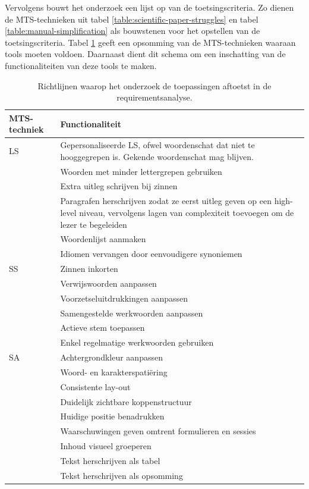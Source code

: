 Vervolgens bouwt het onderzoek een lijst op van de toetsingscriteria. Zo dienen de MTS-technieken uit tabel \ref{table:scientific-paper-struggles} en tabel \ref{table:manual-simplification} als bouwstenen voor het opstellen van de toetsingscriteria. Tabel \ref{table:criteria-requirementsanalysis} geeft een opsomming van de MTS-technieken waaraan tools moeten voldoen. Daarnaast dient dit schema om een inschatting van de functionaliteiten van deze tools te maken.

\begin{center}
	\begin{table}[H]
		\begin{tabular}{ | m{4cm} | m{11cm} | } 
			\hline
			\textbf{MTS-techniek} & \textbf{Functionaliteit} \\
			\hline
			LS & Gepersonaliseerde LS, ofwel woordenschat dat niet te hooggegrepen is. Gekende woordenschat mag blijven. \\
			& Woorden met minder lettergrepen gebruiken \\
			& Extra uitleg schrijven bij zinnen \\
			& Paragrafen herschrijven zodat ze eerst uitleg geven op een high-level niveau, vervolgens lagen van complexiteit toevoegen om de lezer te begeleiden \\
			& Woordenlijst aanmaken \\
			& Idiomen vervangen door eenvoudigere synoniemen \\
			\hline
			SS & Zinnen inkorten \\
			& Verwijswoorden aanpassen \\
			& Voorzetseluitdrukkingen aanpassen \\
			& Samengestelde werkwoorden aanpassen \\
			& Actieve stem toepassen \\
			& Enkel regelmatige werkwoorden gebruiken \\
			\hline
			SA & Achtergrondkleur aanpassen \\
			& Woord- en karakterspatiëring \\
			& Consistente lay-out \\
			& Duidelijk zichtbare koppenstructuur \\
			& Huidige positie benadrukken \\
			& Waarschuwingen geven omtrent formulieren en sessies \\
			& Inhoud visueel groeperen \\
			& Tekst herschrijven als tabel \\
			& Tekst herschrijven als opsomming \\
			\hline
		\end{tabular}
		\caption{Richtlijnen waarop het onderzoek de toepassingen aftoetst in de requirementsanalyse.}
		\label{table:criteria-requirementsanalysis}	
	\end{table}
\end{center}

